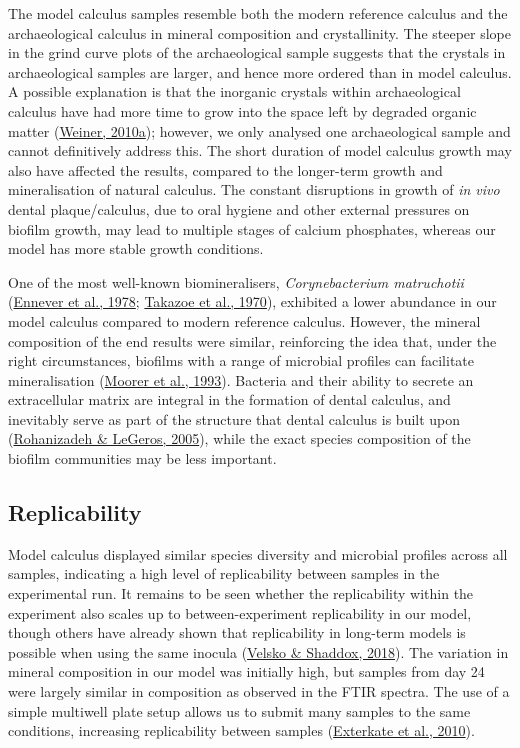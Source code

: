 \documentclass[
  letterpaper,
]{book}
\begin{document}
The model calculus samples resemble both the modern reference calculus
and the archaeological calculus in mineral composition and
crystallinity. The steeper slope in the grind curve plots of the
archaeological sample suggests that the crystals in archaeological
samples are larger, and hence more ordered than in model calculus. A
possible explanation is that the inorganic crystals within
archaeological calculus have had more time to grow into the space left
by degraded organic matter
(\protect\hyperlink{ref-weinerBiologicalMaterials2010}{Weiner, 2010a});
however, we only analysed one archaeological sample and cannot
definitively address this. The short duration of model calculus growth
may also have affected the results, compared to the longer-term growth
and mineralisation of natural calculus. The constant disruptions in
growth of \emph{in vivo} dental plaque/calculus, due to oral hygiene and
other external pressures on biofilm growth, may lead to multiple stages
of calcium phosphates, whereas our model has more stable growth
conditions.

One of the most well-known biomineralisers, \emph{Corynebacterium
matruchotii}
(\protect\hyperlink{ref-enneverCharacterizationBacterionema1978}{Ennever
et al., 1978};
\protect\hyperlink{ref-takazoeCalciumHydroxyapatite1970}{Takazoe et al.,
1970}), exhibited a lower abundance in our model calculus compared to
modern reference calculus. However, the mineral composition of the end
results were similar, reinforcing the idea that, under the right
circumstances, biofilms with a range of microbial profiles can
facilitate mineralisation
(\protect\hyperlink{ref-moorerCalcificationCariogenic1993}{Moorer et
al., 1993}). Bacteria and their ability to secrete an extracellular
matrix are integral in the formation of dental calculus, and inevitably
serve as part of the structure that dental calculus is built upon
(\protect\hyperlink{ref-rohanizadehUltrastructuralStudy2005}{Rohanizadeh
\& LeGeros, 2005}), while the exact species composition of the biofilm
communities may be less important.

\hypertarget{replicability}{%
\subsection{Replicability}\label{replicability}}

Model calculus displayed similar species diversity and microbial
profiles across all samples, indicating a high level of replicability
between samples in the experimental run. It remains to be seen whether
the replicability within the experiment also scales up to
between-experiment replicability in our model, though others have
already shown that replicability in long-term models is possible when
using the same inocula
(\protect\hyperlink{ref-velskoConsistentReproducible2018}{Velsko \&
Shaddox, 2018}). The variation in mineral composition in our model was
initially high, but samples from day 24 were largely similar in
composition as observed in the FTIR spectra. The use of a simple
multiwell plate setup allows us to submit many samples to the same
conditions, increasing replicability between samples
(\protect\hyperlink{ref-extercateAAA2010}{Exterkate et al., 2010}).
\end{document}
